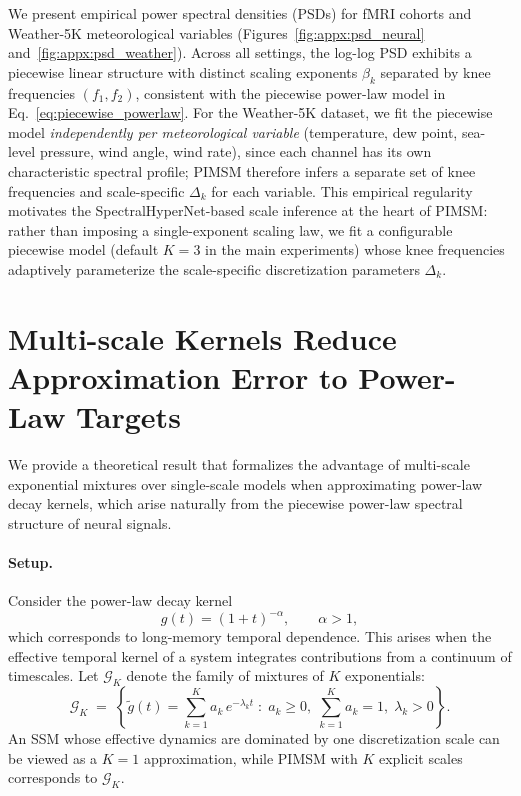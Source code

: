 \documentclass{article}
\begin{document}
We present empirical power spectral densities (PSDs) for fMRI cohorts and Weather-5K meteorological variables (Figures~\ref{fig:appx:psd_neural} and~\ref{fig:appx:psd_weather}).
Across all settings, the log-log PSD exhibits a piecewise linear structure with distinct scaling exponents $\beta_k$ separated by knee frequencies $(f_1, f_2)$, consistent with the piecewise power-law model in Eq.~\eqref{eq:piecewise_powerlaw}.
For the Weather-5K dataset, we fit the piecewise model \emph{independently per meteorological variable} (temperature, dew point, sea-level pressure, wind angle, wind rate), since each channel has its own characteristic spectral profile; PIMSM therefore infers a separate set of knee frequencies and scale-specific $\Delta_k$ for each variable.
This empirical regularity motivates the SpectralHyperNet-based scale inference at the heart of PIMSM: rather than imposing a single-exponent scaling law, we fit a configurable piecewise model (default $K=3$ in the main experiments) whose knee frequencies adaptively parameterize the scale-specific discretization parameters $\Delta_k$.

\section{Multi-scale Kernels Reduce Approximation Error to Power-Law Targets}
\label{sec:appx:kernel_approx}

We provide a theoretical result that formalizes the advantage of multi-scale exponential mixtures over single-scale models when approximating power-law decay kernels, which arise naturally from the piecewise power-law spectral structure of neural signals.

\paragraph{Setup.}
Consider the power-law decay kernel
\begin{equation}
g(t) = (1+t)^{-\alpha}, \qquad \alpha > 1,
\label{eq:powerlaw_kernel}
\end{equation}
which corresponds to long-memory temporal dependence.
This arises when the effective temporal kernel of a system integrates contributions from a continuum of timescales.
Let $\mathcal{G}_K$ denote the family of mixtures of $K$ exponentials:
\begin{equation}
\mathcal{G}_K \;=\; \left\{ \tilde{g}(t) = \sum_{k=1}^{K} a_k\, e^{-\lambda_k t} \;:\; a_k \ge 0,\; \sum_{k=1}^K a_k = 1,\; \lambda_k > 0 \right\}.
\label{eq:G_K}
\end{equation}
An SSM whose effective dynamics are dominated by one discretization scale can be viewed as a $K=1$ approximation, while PIMSM with $K$ explicit scales corresponds to $\mathcal{G}_K$.
\end{document}
